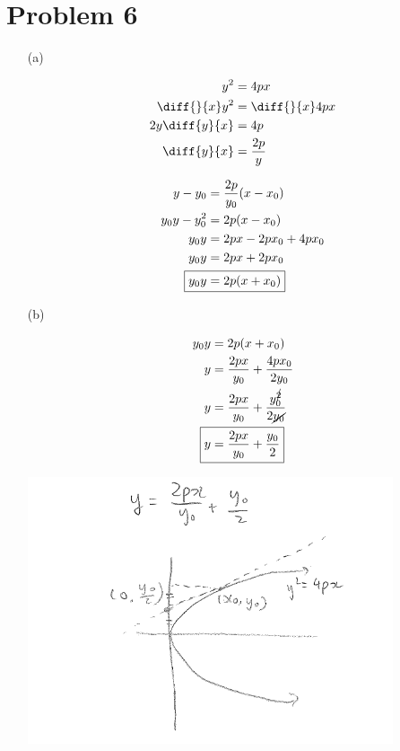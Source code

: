 \documentclass{article}
\begin{document}
\section*{Problem 6}
\begin{itemize}
\item[(a)]
	\begin{minipage}[t]{\linewidth}
		\centering
		\setlength{\abovedisplayskip}{0pt}
		\begin{minipage}[t]{0.31\linewidth}
		\begin{align*}
			y^2&=4px \\
			\diff{}{x}y^2&=\diff{}{x}4px \\
			2y\diff{y}{x}&=4p \\
			\diff{y}{x}&=\frac{2p}{y}
		\end{align*}
		\end{minipage}
		\begin{minipage}[t]{0.31\linewidth}
		\begin{align*}
			y-y_0&=\frac{2p}{y_0}(x-x_0) \\
			y_0y-y_0^2&=2p(x-x_0) \\
			y_0y&=2px-2px_0+4px_0 \\
			y_0y&=2px+2px_0 \\
			\Aboxed{y_0y&=2p(x+x_0)}
		\end{align*}
		\end{minipage}
	\end{minipage}

\item[(b)]
	\phantom{}

	\centering
	\begin{minipage}[t]{0.2\linewidth}
		\begin{align*}
			y_0y&=2p(x+x_0) \\
			y&=\frac{2px}{y_0}+\frac{4px_0}{2y_0} \\
			y&=\frac{2px}{y_0}+\frac{y_0^{\cancel{2}}}{2\cancel{y_0}} \\
			\Aboxed{y&=\frac{2px}{y_0}+\frac{y_0}{2}} \\
		\end{align*}
	\end{minipage}
	\begin{minipage}[t]{0.55\linewidth}
		\centering
    	\includegraphics[valign=t,scale=0.9]{q6b.png}
	\end{minipage}
	\flushleft
	
\end{itemize}
\end{document}
